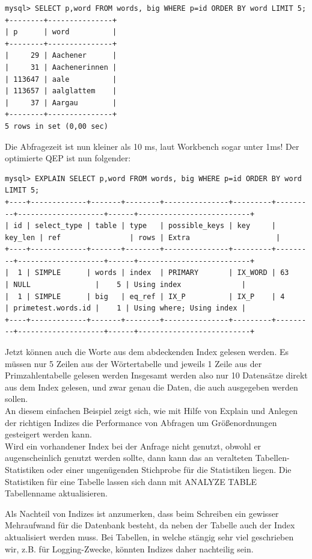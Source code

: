 \begin{lstlisting}
mysql> SELECT p,word FROM words, big WHERE p=id ORDER BY word LIMIT 5;
+--------+---------------+
| p      | word          |
+--------+---------------+
|     29 | Aachener      |
|     31 | Aachenerinnen |
| 113647 | aale          |
| 113657 | aalglattem    |
|     37 | Aargau        |
+--------+---------------+
5 rows in set (0,00 sec)
\end{lstlisting}
Die Abfragezeit ist nun kleiner als 10 ms, laut Workbench sogar unter 1ms! Der optimierte QEP ist nun folgender:
\begin{lstlisting}[basicstyle=\ttfamily\tiny]
mysql> EXPLAIN SELECT p,word FROM words, big WHERE p=id ORDER BY word LIMIT 5;
+----+-------------+-------+--------+---------------+---------+---------+--------------------+------+--------------------------+
| id | select_type | table | type   | possible_keys | key     | key_len | ref                | rows | Extra                    |
+----+-------------+-------+--------+---------------+---------+---------+--------------------+------+--------------------------+
|  1 | SIMPLE      | words | index  | PRIMARY       | IX_WORD | 63      | NULL               |    5 | Using index              |
|  1 | SIMPLE      | big   | eq_ref | IX_P          | IX_P    | 4       | primetest.words.id |    1 | Using where; Using index |
+----+-------------+-------+--------+---------------+---------+---------+--------------------+------+--------------------------+
\end{lstlisting}
Jetzt können auch die Worte aus dem abdeckenden Index gelesen werden. Es müssen nur 5 Zeilen aus der Wörtertabelle und jeweils 1 Zeile aus der Primzahlentabelle gelesen werden
Insgesamt werden also nur 10 Datensätze direkt aus dem Index gelesen, und zwar genau die Daten, die auch ausgegeben werden sollen.
\\An diesem einfachen Beispiel zeigt sich, wie mit Hilfe von Explain und Anlegen der richtigen Indizes die Performance von Abfragen um Größenordnungen gesteigert werden kann.
\\Wird ein vorhandener Index bei der Anfrage nicht genutzt, obwohl er augenscheinlich genutzt werden sollte, dann kann das an veralteten Tabellen-Statistiken oder einer ungenügenden Stichprobe für die Statistiken liegen. Die Statistiken für eine Tabelle lassen sich dann mit ANALYZE TABLE Tabellenname aktualisieren.

Als Nachteil von Indizes ist anzumerken, dass beim Schreiben ein gewisser Mehraufwand für die Datenbank besteht, da neben der Tabelle auch der Index aktualisiert werden muss. Bei Tabellen, in welche stängig sehr viel geschrieben wir, z.B. für Logging-Zwecke, könnten Indizes daher nachteilig sein.

